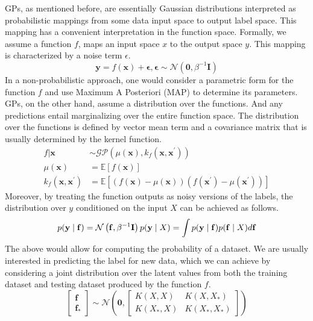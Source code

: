 \documentclass[letterpaper,11pt]{extarticle}
\begin{document}
GPs, as mentioned before, are essentially Gaussian distributions interpreted as probabilistic mappings from some data input space to output label space. This mapping has a convenient interpretation in the function space. Formally, we assume a function $f$, maps an input space $x$ to the output space $y$. This mapping is characterized by a noise term $\epsilon$.
$$
\mathbf{y}=f(\mathbf{x})+\boldsymbol{\epsilon}, \boldsymbol{\epsilon} \sim \mathcal{N}\left(\mathbf{0}, \beta^{-1} \mathbf{I}\right)
$$
In a non-probabilistic approach, one would consider a parametric form for the function $f$ and use Maximum A Posteriori (MAP) to determine its parameters. GPs, on the other hand, assume a distribution over the functions. And any predictions entail marginalizing over the entire function space. The distribution over the functions is defined by vector mean term and a covariance matrix that is usually determined by the kernel function. 
$$
\begin{aligned}f|\mathbf{x} & \sim \mathcal{G} \mathcal{P}\left(\mu(\mathbf{x}), k_{f}\left(\mathbf{x}, \mathbf{x}^{\prime}\right)\right) \\
\mu(\mathbf{x}) &=\mathbb{E}[f(\mathbf{x})] \\
k_{f}\left(\mathbf{x}, \mathbf{x}^{\prime}\right) &=\mathbb{E}\left[(f(\mathbf{x})-\mu(\mathbf{x}))\left(f\left(\mathbf{x}^{\prime}\right)-\mu\left(\mathbf{x}^{\prime}\right)\right)\right]
\end{aligned}
$$
Moreover, by treating the function outputs as noisy versions of the labels, the distribution over $y$ conditioned on the input $X$ can be achieved as follows. 
$$
p(\mathbf{y} \mid \mathbf{f})=\mathcal{N}\left(\mathbf{f}, \beta^{-1} \mathbf{I}\right) \\
p(\mathbf{y} \mid X)=\int p(\mathbf{y} \mid \mathbf{f}) p(\mathbf{f} \mid X) d \mathbf{f}
$$
The above would allow for computing the probability of a dataset. We are usually interested in predicting the label for new data, which we can achieve by considering a joint distribution over the latent values from both the training dataset and testing dataset produced by the function $f$.     
$$
\left[\begin{array}{l}
\mathbf{f} \\
\mathbf{f}_{*}
\end{array}\right] \sim \mathcal{N}\left(\mathbf{0},\left[\begin{array}{ll}
K(X, X) & K\left(X, X_{*}\right) \\
K\left(X_{*}, X\right) & K\left(X_{*}, X_{*}\right)
\end{array}\right]\right)
$$
\end{document}
